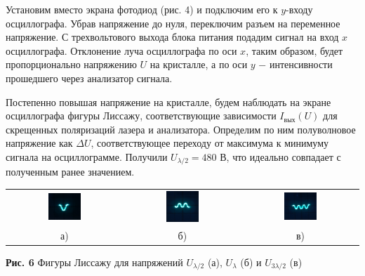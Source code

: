 \documentclass[a4paper,12pt]{article} %
\begin{document}
\hfill \break Установим вместо экрана фотодиод (рис. 4) и подключим его к $y$-входу осциллографа. Убрав напряжение до нуля, переключим разъем на переменное напряжение. С трехвольтового выхода блока питания подадим сигнал на вход $x$ осциллографа. Отклонение луча осциллографа по оси $x$, таким образом, будет пропорционально напряжению $U$ на кристалле, а по оси $y$ $-$ интенсивности прошедшего через анализатор сигнала. 

\hfill \break Постепенно повышая напряжение на кристалле, будем наблюдать на экране осциллографа фигуры Лиссажу, соответствующие зависимости $I_{\text{вых}}(U)$ для скрещенных поляризаций лазера и анализатора. Определим по ним полуволновое напряжение как $\Delta U$, соответствующее переходу от максимума к минимуму сигнала на осциллограмме. Получили $U_{\lambda/2} = 480$ В, что идеально совпадает с полученным ранее значением.

\hfill \break \begin{center}
\begin{tabular}{ccc}
\includegraphics[width=0.3\textwidth]{4.7.2_6.png}&\includegraphics[width=0.3\textwidth]{4.7.2_7.png}&\includegraphics[width=0.3\textwidth]{4.7.2_8.png}\\
а) & б) & в)\\
\end{tabular}
\hfill \break \textbf {Рис. 6} Фигуры Лиссажу для напряжений $U_{\lambda/2}$ (а), $U_{\lambda}$ (б) и $U_{3\lambda/2}$ (в) \\
\end{center}
\end{document}
